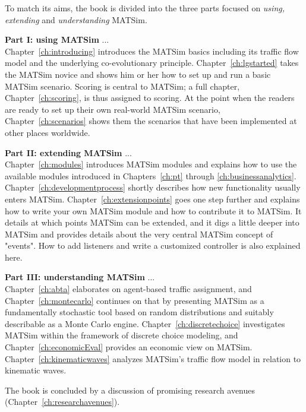 To match its aims, the book is divided into the three parts focused on \emph{using, extending} and \emph{understanding} MATSim.

\textbf{Part I: using MATSim} ... \\
Chapter~\ref{ch:introducing} introduces the MATSim basics including its traffic flow model and the underlying co-evolutionary principle. Chapter~\ref{ch:lgstarted} takes the MATSim novice and shows him or her how to set up and run a basic MATSim scenario. Scoring is central to MATSim; a full chapter, Chapter~\ref{ch:scoring}, is thus assigned to scoring. At the point when the readers are ready to set up their own real-world MATSim scenario, Chapter~\ref{ch:scenarios} shows them the scenarios that have been implemented at other places worldwide. 

\textbf{Part II: extending MATSim} ... \\
Chapter~\ref{ch:modules} introduces MATSim modules and explains how to use the available modules introduced in Chapters~\ref{ch:pt} through \ref{ch:businessanalytics}. Chapter~\ref{ch:developmentprocess} shortly describes how new functionality usually enters MATSim. Chapter~\ref{ch:extensionpoints} goes one step further and explains how to write your own MATSim module and how to contribute it to MATSim. It details at which points MATSim can be extended, and it digs a little deeper into MATSim and provides details about the very central MATSim concept of "events". How to add listeners and write a customized controller is also explained here.

\textbf{Part III: understanding MATSim} ... \\
Chapter~\ref{ch:abta} elaborates on agent-based traffic assignment, and Chapter~\ref{ch:montecarlo} continues on that by presenting MATSim as a fundamentally stochastic tool based on random distributions and suitably describable as a Monte Carlo engine. Chapter~\ref{ch:discretechoice} investigates MATSim within the framework of discrete choice modeling, and Chapter~\ref{ch:economicEval} provides an economic view on MATSim. Chapter~\ref{ch:kinematicwaves} analyzes MATSim's traffic flow model in relation to kinematic waves.


The book is concluded by a discussion of promising research avenues (Chapter~\ref{ch:researchavenues}).

